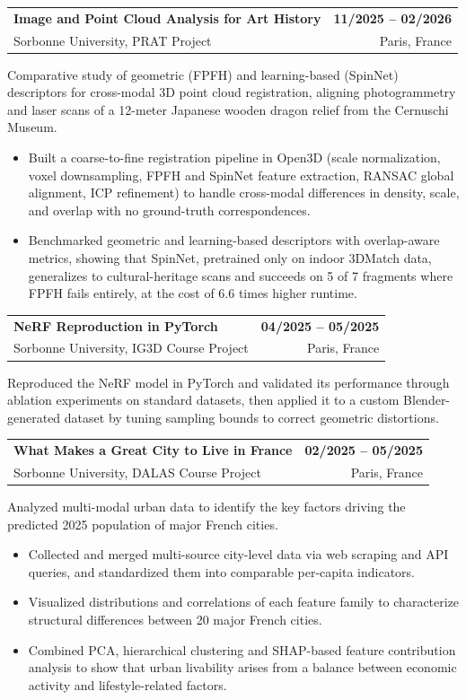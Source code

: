 \documentclass[a4paper,12pt]{article}
\makeatletter
\newcommand{\resumeItem}[1]{
  \item\small{
    {#1\vspace{-1pt}}
  }
}
\newcommand{\resumeProjectHeadingFourItemResearch}[4]{
    \needspace{6\baselineskip}\item
    \begin{tabular*}{1.001\textwidth}{l@{\extracolsep{\fill}}r}
      #1 & \textbf{#2}\\
      {#3} & \textnormal{#4} \\
    \end{tabular*}\vspace{-7pt}
}
\newcommand{\resumeItemListStart}{\begin{itemize}}
\newcommand{\resumeItemListEnd}{\end{itemize}\vspace{-5pt}}
\newcommand{\projectdesc}[1]{%
  {\fontsize{11pt}{12pt}\selectfont #1}\vspace{-6pt}%
}
\makeatother
\begin{document}
    \resumeProjectHeadingFourItemResearch
    {\textbf{Image and Point Cloud Analysis for Art History}}{11/2025 -- 02/2026}{Sorbonne University, PRAT Project}{Paris, France}

    \projectdesc{Comparative study of geometric (FPFH) and learning-based (SpinNet) descriptors for cross-modal 3D point cloud registration, aligning photogrammetry and laser scans of a 12-meter Japanese wooden dragon relief from the Cernuschi Museum.}
    \resumeItemListStart
      \resumeItem{Built a coarse-to-fine registration pipeline in Open3D (scale normalization, voxel downsampling, FPFH and SpinNet feature extraction, RANSAC global alignment, ICP refinement) to handle cross-modal differences in density, scale, and overlap with no ground-truth correspondences.}
      \resumeItem{Benchmarked geometric and learning-based descriptors with overlap-aware metrics, showing that SpinNet, pretrained only on indoor 3DMatch data, generalizes to cultural-heritage scans and succeeds on 5 of 7 fragments where FPFH fails entirely, at the cost of 6.6 times higher runtime.}
    \resumeItemListEnd

    \resumeProjectHeadingFourItemResearch
    {\textbf{NeRF Reproduction in PyTorch}}{04/2025 -- 05/2025}
    {Sorbonne University, IG3D Course Project}{Paris, France}

    \projectdesc{Reproduced the NeRF model in PyTorch and validated its performance through ablation experiments on standard datasets, then applied it to a custom Blender-generated dataset by tuning sampling bounds to correct geometric distortions.}

    \resumeProjectHeadingFourItemResearch
    {\textbf{What Makes a Great City to Live in France}}{02/2025 -- 05/2025}
    {Sorbonne University, DALAS Course Project}{Paris, France}

    \projectdesc{Analyzed multi-modal urban data to identify the key factors driving the predicted 2025 population of major French cities.}
    \resumeItemListStart
      \resumeItem{Collected and merged multi-source city-level data via web scraping and API queries, and standardized them into comparable per-capita indicators.}
      \resumeItem{Visualized distributions and correlations of each feature family to characterize structural differences between 20 major French cities.}
      \resumeItem{Combined PCA, hierarchical clustering and SHAP-based feature contribution analysis to show that urban livability arises from a balance between economic activity and lifestyle-related factors.}
    \resumeItemListEnd
\end{document}
